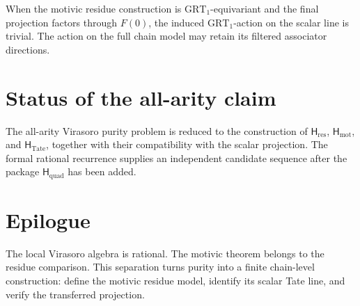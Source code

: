 \begin{remark}
\label{rem:vmpar-grt-trivial-on-shadow}
When the motivic residue construction is \(\mathrm{GRT}_1\)-equivariant
and the final projection factors through \(F(0)\), the induced
\(\mathrm{GRT}_1\)-action on the scalar line is trivial.  The action on
the full chain model may retain its filtered associator directions.
\end{remark}

\section{Status of the all-arity claim}
\label{sec:vmpar-closure}

\begin{corollary}
\label{cor:item-19-closed}
\ClaimStatusOpen
The all-arity Virasoro purity problem is reduced to the construction
of \(\mathsf H_{\mathrm{res}}\), \(\mathsf H_{\mathrm{mot}}\), and
\(\mathsf H_{\mathrm{Tate}}\), together with their compatibility with
the scalar projection.  The formal rational recurrence supplies an
independent candidate sequence after the package
\(\mathsf H_{\mathrm{quad}}\) has been added.
\end{corollary}

\section*{Epilogue}
\label{sec:vmpar-epilogue}

The local Virasoro algebra is rational.  The motivic theorem belongs
to the residue comparison.  This separation turns purity into a
finite chain-level construction: define the motivic residue model,
identify its scalar Tate line, and verify the transferred projection.
